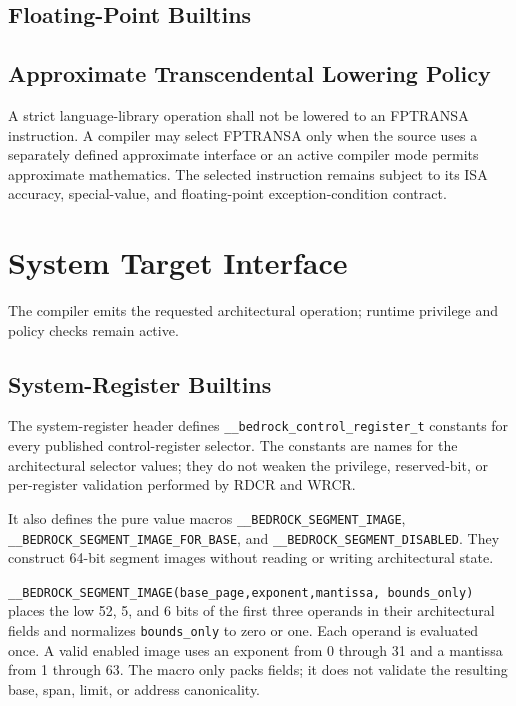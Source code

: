 \documentclass[10pt,twoside]{article}
\begin{document}
\subsection{Floating-Point Builtins}


\subsection{Approximate Transcendental Lowering Policy}
A strict language-library operation shall not be lowered to an FPTRANSA
instruction. A compiler may select FPTRANSA only when the source uses a
separately defined approximate interface or an active compiler mode permits
approximate mathematics. The selected instruction remains subject to its ISA
accuracy, special-value, and floating-point exception-condition contract.

\section{System Target Interface}\label{page:system-target-interface}
The compiler emits the requested architectural operation; runtime privilege and policy checks
remain active.

\subsection{System-Register Builtins}


The system-register header defines \texttt{\_\_bedrock\_control\_register\_t} constants for every published
control-register selector. The constants are names for the architectural selector values; they do not weaken the
privilege, reserved-bit, or per-register validation performed by RDCR and WRCR.

It also defines the pure value macros
\texttt{\_\allowbreak{}\_\allowbreak{}BEDROCK\_\allowbreak{}SEGMENT\_\allowbreak{}IMAGE},
\texttt{\_\allowbreak{}\_\allowbreak{}BEDROCK\_\allowbreak{}SEGMENT\_\allowbreak{}IMAGE\_\allowbreak{}FOR\_\allowbreak{}BASE}, and
\texttt{\_\allowbreak{}\_\allowbreak{}BEDROCK\_\allowbreak{}SEGMENT\_\allowbreak{}DISABLED}. They construct 64-bit segment
images without reading or writing architectural state.

\texttt{\_\_BEDROCK\_SEGMENT\_IMAGE(base\_page,exponent,mantissa,
bounds\_only)} places the low 52, 5, and 6 bits of the first three operands in
their architectural fields and normalizes \texttt{bounds\_only} to zero or
one. Each operand is evaluated once. A valid enabled image uses an exponent
from 0 through 31 and a mantissa from 1 through 63. The macro only packs
fields; it does not validate the resulting base, span, limit, or address
canonicality.
\end{document}
